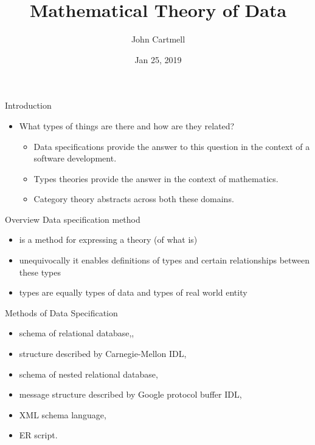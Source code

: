 \documentclass[xcolor=pst,dvips]{beamer}   %
\title[John Cartmell]{Mathematical Theory of Data}
\author{John Cartmell}
\institute{Ad Otium}
\date{Jan 25, 2019}
\begin{document}
\section{\MToDsection}
\subsection{\MToDsubsectionIntroduction}

\begin{frame}
\titlepage
\end{frame}

\begin{frame}{Introduction}
\begin{itemize}
\item
What types of things are there and how are they related? 
\begin{itemize}
\pause \item Data specifications provide the answer to this question in the context of a software development. 
\pause \item Types theories provide the answer in the context of mathematics. 
\pause \item Category theory abstracts across both these domains.
\end{itemize}
\end{itemize}
\end{frame}

\begin{frame}{Overview}
Data specification method 
\begin{itemize}
\item is a method for expressing a  theory (of what is)
\item unequivocally it enables definitions of types and certain relationships between these types
\item types are equally types of data and types of real world entity
\end{itemize}
\end{frame}

\begin{frame}{Methods of Data Specification}
\begin{itemize}
	\item schema of relational database,,
	\item structure described by Carnegie-Mellon IDL,
	\item schema of nested relational database,
	\item message structure described by Google protocol buffer IDL,
	\item XML schema language,
	\item ER script.
\end{itemize}
\begin{arrows}
\end{arrows}
\end{frame}
\end{document}
